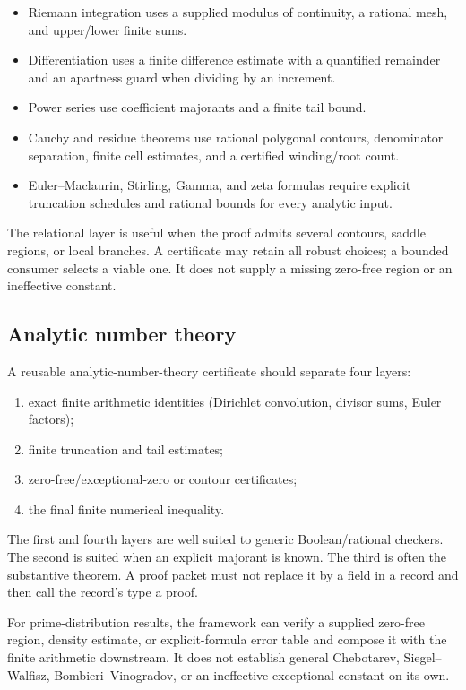 \begin{itemize}
\item Riemann integration uses a supplied modulus of continuity, a rational mesh, and upper/lower finite sums.
\item Differentiation uses a finite difference estimate with a quantified remainder and an apartness guard when dividing by an increment.
\item Power series use coefficient majorants and a finite tail bound.
\item Cauchy and residue theorems use rational polygonal contours, denominator separation, finite cell estimates, and a certified winding/root count.
\item Euler--Maclaurin, Stirling, Gamma, and zeta formulas require explicit truncation schedules and rational bounds for every analytic input.
\end{itemize}

The relational layer is useful when the proof admits several contours, saddle regions, or local branches.  A certificate may retain all robust choices; a bounded consumer selects a viable one.  It does not supply a missing zero-free region or an ineffective constant.

\subsection{Analytic number theory}

A reusable analytic-number-theory certificate should separate four layers:
\begin{enumerate}[label=(\alph*)]
\item exact finite arithmetic identities (Dirichlet convolution, divisor sums, Euler factors);
\item finite truncation and tail estimates;
\item zero-free/exceptional-zero or contour certificates;
\item the final finite numerical inequality.
\end{enumerate}
The first and fourth layers are well suited to generic Boolean/rational checkers.  The second is suited when an explicit majorant is known.  The third is often the substantive theorem.  A proof packet must not replace it by a field in a record and then call the record's type a proof.

For prime-distribution results, the framework can verify a supplied zero-free region, density estimate, or explicit-formula error table and compose it with the finite arithmetic downstream.  It does not establish general Chebotarev, Siegel--Walfisz, Bombieri--Vinogradov, or an ineffective exceptional constant on its own.

